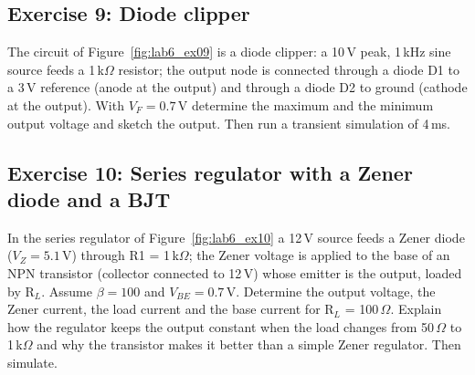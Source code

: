 

\subsection{Exercise 9: Diode clipper}
The circuit of Figure~\ref{fig:lab6_ex09} is a diode clipper: a 10\,V peak, 1\,kHz sine source feeds a 1\,k$\Omega$ resistor; the output node is connected through a diode D1 to a 3\,V reference (anode at the output) and through a diode D2 to ground (cathode at the output). With $V_F=0.7$\,V determine the maximum and the minimum output voltage and sketch the output. Then run a transient simulation of 4\,ms.






\subsection{Exercise 10: Series regulator with a Zener diode and a BJT}
In the series regulator of Figure~\ref{fig:lab6_ex10} a 12\,V source feeds a Zener diode ($V_Z=5.1$\,V) through R1 = 1\,k$\Omega$; the Zener voltage is applied to the base of an NPN transistor (collector connected to 12\,V) whose emitter is the output, loaded by R$_L$. Assume $\beta=100$ and $V_{BE}=0.7$\,V. Determine the output voltage, the Zener current, the load current and the base current for R$_L$ = 100\,$\Omega$. Explain how the regulator keeps the output constant when the load changes from 50\,$\Omega$ to 1\,k$\Omega$ and why the transistor makes it better than a simple Zener regulator. Then simulate.

